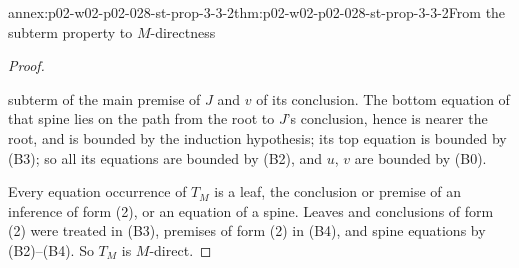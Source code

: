 \begin{annexitem}{annex:p02-w02-p02-028-st-prop-3-3-2}{thm:p02-w02-p02-028-st-prop-3-3-2}{From the subterm property to \(M\)-directness}
\begin{proof}
\begin{itemize}
        subterm of the main premise of \(J\) and \(v\) of its conclusion.  The
        bottom equation of that spine lies on the path from the root to
        \(J\)'s conclusion, hence is nearer the root, and is bounded by the
        induction hypothesis; its top equation is bounded by (B3); so all
        its equations are bounded by (B2), and \(u\), \(v\) are bounded by
        (B0).
\end{itemize}
Every equation occurrence of \(T_M\) is a leaf, the conclusion or premise of
an inference of form (2), or an equation of a spine.  Leaves and conclusions
of form (2) were treated in (B3), premises of form (2) in (B4), and spine
equations by (B2)--(B4).  So \(T_M\) is \(M\)-direct.
\end{proof}
\end{annexitem}

